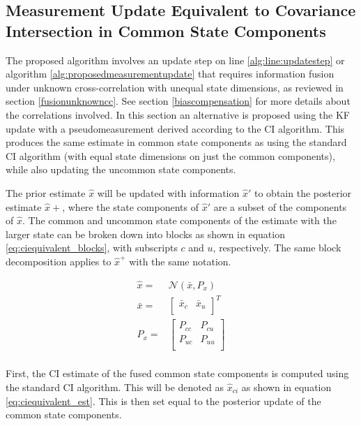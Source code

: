 \documentclass[journal]{IEEEtran}
\begin{document}
\subsection{Measurement Update Equivalent to Covariance Intersection in Common State Components} \label{ciequivalentmeasurement}
The proposed algorithm involves an update step on line \ref{alg:line:updatestep} or algorithm \ref{alg:proposedmeasurementupdate} that requires information fusion under unknown cross-correlation with unequal state dimensions, as reviewed in section \ref{fusionunknowncc}. See section \ref{biascompensation} for more details about the correlations involved. In this section an alternative is proposed using the KF update with a pseudomeasurement derived according to the CI algorithm. This produces the same estimate in common state components as using the standard CI algorithm (with equal state dimensions on just the common components), while also updating the uncommon state components.

The prior estimate $\hat{x}$ will be updated with information $\hat{x}'$ to obtain the posterior estimate $\hat{x}+$, where the state components of $\hat{x}'$ are a subset of the components of $\hat{x}$. The common and uncommon state components of the estimate with the larger state can be broken down into blocks as shown in equation \ref{eq:ciequivalent_blocks}, with subscripts $c$ and $u$, respectively. The same block decomposition applies to $\hat{x}^{+}$ with the same notation.

\begin{equation}
\begin{aligned}
    \hat{x} = {}& \mathcal{N}(\bar{x}, P_{x})\\
    \bar{x} = {}& \begin{bmatrix}
                        \bar{x}_{c} & \bar{x}_{u} \\
                    \end{bmatrix}^{T} \\
    P_{x} = {}& \begin{bmatrix}
                        P_{cc} & P_{cu} \\
                        P_{uc} & P_{uu} \\
                    \end{bmatrix} \\
\end{aligned} \label{eq:ciequivalent_blocks}
\end{equation}

First, the CI estimate of the fused common state components is computed using the standard CI algorithm. This will be denoted as $\hat{x}_{ci}$ as shown in equation \ref{eq:ciequivalent_est}. This is then set equal to the posterior update of the common state components.
\end{document}
